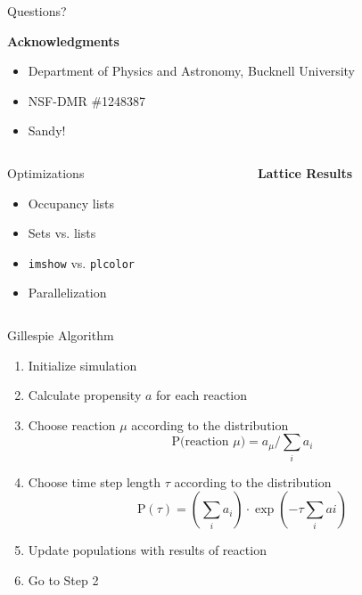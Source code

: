 \documentclass[11pt]{beamer}              %
\begin{document}
\begin{frame}[fragile]{Questions?}

  \textbf{Acknowledgments}

  \begin{itemize}
    \item Department of Physics and Astronomy, Bucknell University
    \item NSF-DMR \#1248387
    \item Sandy!
  \end{itemize}

  \begin{columns}
    \begin{column}{.5\linewidth}
      \vspace{5mm}

    \begin{alertblock}{Optimizations}
    \begin{itemize}
      \item Occupancy lists
      \item Sets vs. lists
      \item \verb|imshow| vs. \verb|plcolor| %
      \item Parallelization
    \end{itemize}
  \end{alertblock}
  \end{column}
  \begin{column}{.5\linewidth}
    \textbf{Lattice Results}

    \vspace{5mm}
  \end{column}
  \end{columns}
\end{frame}


\appendix

\begin{frame}{Gillespie Algorithm }
  \begin{enumerate}
    \item Initialize simulation
    \item Calculate propensity $a$ for each reaction
    \item Choose reaction $\mu$ according to the distribution
      $$\text{P(reaction }\mu) = a_\mu / \sum_{i}a_i$$ %
    \item Choose time step length $\tau$ according to the distribution
      $$\text{P}(\tau)=\left(\sum_i a_i\right) \cdot \exp{\left(-\tau \sum_i ai\right)}$$
    \item Update populations with results of reaction
    \item Go to Step 2
  \end{enumerate}
\end{frame}
\end{document}
